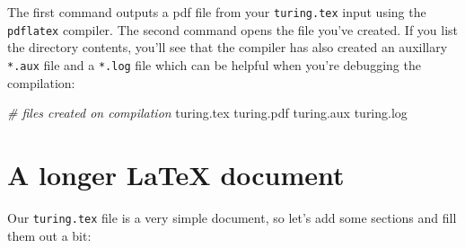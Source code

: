 \documentclass[
]{book}
\newenvironment{Shaded}{\begin{snugshade}}{\end{snugshade}}
\newcommand{\CommentTok}[1]{\textcolor[rgb]{0.56,0.35,0.01}{\textit{#1}}}
\newcommand{\NormalTok}[1]{#1}
\begin{document}
The first command outputs a pdf file from your \texttt{turing.tex} input using the \texttt{pdflatex} compiler. The second command opens the file you've created. If you list the directory contents, you'll see that the compiler has also created an auxillary \texttt{*.aux} file and a \texttt{*.log} file which can be helpful when you're debugging the compilation:

\begin{Shaded}
\begin{Highlighting}[]
\CommentTok{\# files created on compilation}
\NormalTok{turing.tex}
\NormalTok{turing.pdf}
\NormalTok{turing.aux}
\NormalTok{turing.log}
\end{Highlighting}
\end{Shaded}

\section{A longer LaTeX document}\label{longer}

Our \texttt{turing.tex} file is a very simple document, so let's add some sections and fill them out a bit:
\end{document}
